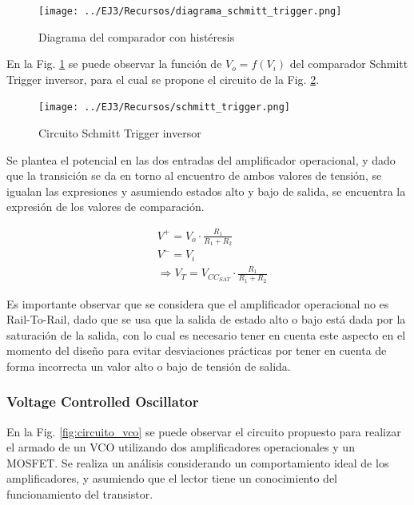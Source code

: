 \begin{figure}[H]
    \centering
    \texttt{[image: ../EJ3/Recursos/diagrama\_schmitt\_trigger.png]}
    \caption{Diagrama del comparador con hist\'eresis}
    \label{fig:diagrama_schmitt_trigger}
\end{figure}

En la Fig. \ref{fig:diagrama_schmitt_trigger} se puede observar la funci\'on de $V_o = f(V_i)$ del comparador Schmitt Trigger inversor,
para el cual se propone el circuito de la Fig. \ref{fig:circuito_schmitt_trigger}.

\begin{figure}[H]
    \centering
    \texttt{[image: ../EJ3/Recursos/schmitt\_trigger.png]}
    \caption{Circuito Schmitt Trigger inversor}
    \label{fig:circuito_schmitt_trigger}
\end{figure}

Se plantea el potencial en las dos entradas del amplificador operacional, y dado que la transici\'on se da en torno al encuentro
de ambos valores de tensi\'on, se igualan las expresiones y asumiendo estados alto y bajo de salida, se encuentra la expresi\'on
de los valores de comparaci\'on.

\begin{align*}
    & V^{+} = V_o \cdot \frac{R_1}{R_1 + R_2} \\
    & V^{-} = V_i \\
    & \Rightarrow V_T = V_{CC_{SAT}} \cdot \frac{R_1}{R_1 + R_2}
\end{align*}

Es importante observar que se considera que el amplificador operacional no es Rail-To-Rail, dado que se usa que la salida de estado alto o bajo
est\'a dada por la saturaci\'on de la salida, con lo cual es necesario tener en cuenta este aspecto en el momento del dise\~no para evitar desviaciones pr\'acticas
por tener en cuenta de forma incorrecta un valor alto o bajo de tensi\'on de salida.

\subsubsection{Voltage Controlled Oscillator}
En la Fig. \ref{fig:circuito_vco} se puede observar el circuito propuesto para realizar el armado de un VCO utilizando dos amplificadores operacionales
y un MOSFET. Se realiza un an\'alisis considerando un comportamiento ideal de los amplificadores, y asumiendo que el lector tiene un conocimiento del 
funcionamiento del transistor.

